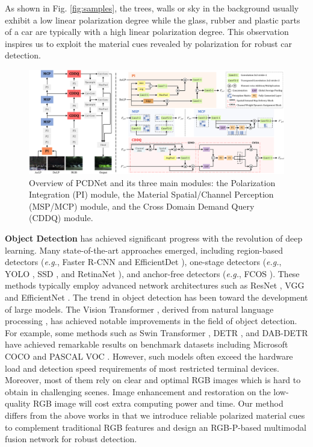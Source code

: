 As shown in Fig. \ref{fig:samples}, the trees, walls or sky in the background usually exhibit a low linear polarization degree while the glass, rubber and plastic parts of a car are typically with a high linear polarization degree. This observation inspires us to exploit the material cues revealed by polarization for robust car detection.

\begin{figure}[ht]
    \centering
    \includegraphics[width=\linewidth]{figure/methodology.pdf}
    \caption{Overview of PCDNet and its three main modules: the Polarization Integration (PI) module, the Material Spatial/Channel Perception (MSP/MCP) module, and the Cross Domain Demand Query (CDDQ) module.}
    \label{fig:pipeline}
\end{figure}

\textbf{Object Detection} has achieved significant progress with the revolution of deep learning. Many state-of-the-art approaches emerged, including region-based detectors (\textit{e.g.}, Faster R-CNN \cite{Ren_2017} and EfficientDet \cite{tan2020efficientdet}), one-stage detectors (\textit{e.g.}, YOLO \cite{redmon2016you}, SSD \cite{liu2016ssd}, and RetinaNet \cite{lin2017focal}), and anchor-free detectors (\textit{e.g.}, FCOS \cite{tian2019fcos}). These methods typically employ advanced network architectures such as ResNet \cite{he2016deep}, VGG \cite{simonyan2014very} and EfficientNet \cite{tan2019efficientnet}. The trend in object detection has been toward the development of large models. The Vision Transformer \cite{dosovitskiy2020image}, derived from natural language processing \cite{zaheer2020big}, has achieved notable improvements in the field of object detection. For example, some methods such as Swin Transformer \cite{liu2021swin}, DETR \cite{carion2020end}, and DAB-DETR \cite{liu2022dabdetr} have achieved remarkable results on benchmark datasets including Microsoft COCO \cite{lin2014microsoft} and PASCAL VOC \cite{everingham2010pascal}. However, such models often exceed the hardware load and detection speed requirements of most restricted terminal devices. Moreover, most of them rely on clear and optimal RGB images which is hard to obtain in challenging scenes. Image enhancement and restoration on the low-quality RGB image will cost extra computing power and time. Our method differs from the above works in that we introduce reliable polarized material cues to complement traditional RGB features and design an RGB-P-based multimodal fusion network for robust detection.

